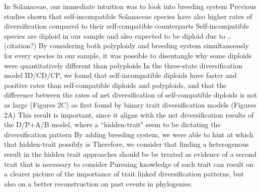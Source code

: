 In Solanaceae, our immediate intuition was to look into breeding system
Previous studies shown that self-incompatible Solanaceae species have also higher rates of diversification compared to their self-compatible counterparts\citep{goldberg_2012}
Self-incompatible species are diploid in our sample and also expected to be diploid due to ..
(citation?)
By considering both polyploidy and breeding system simultaneously for every species in our sample, it was possible to disentangle why some diploids were quantitatively different than polyploids
In the three-state diversification model ID/CD/CP, we found that self-incompatible diploids have faster and positive rates than self-compatible diploids and polyploids, and that the difference between the  rates of net diversification of self-compatible diploids is not as large (Figures 2C) as first found by binary trait diversification models (Figures 2A)
This result is important, since it aligns with the net diversification results of the  D/P+A/B model, where a ``hidden-trait" seem to be dictating the diversification pattern
By adding breeding system, we were able to hint at which that hidden-trait possibly is
Therefore, we consider that finding a heterogenous result in the hidden trait approaches should be be treated as evidence of a second trait that is necessary to consider
Pursuing knowledge of  such trait can result on a clearer picture of the importance of trait linked diversification patterns, but also on a better reconstruction on past events in phylogenies.






%
